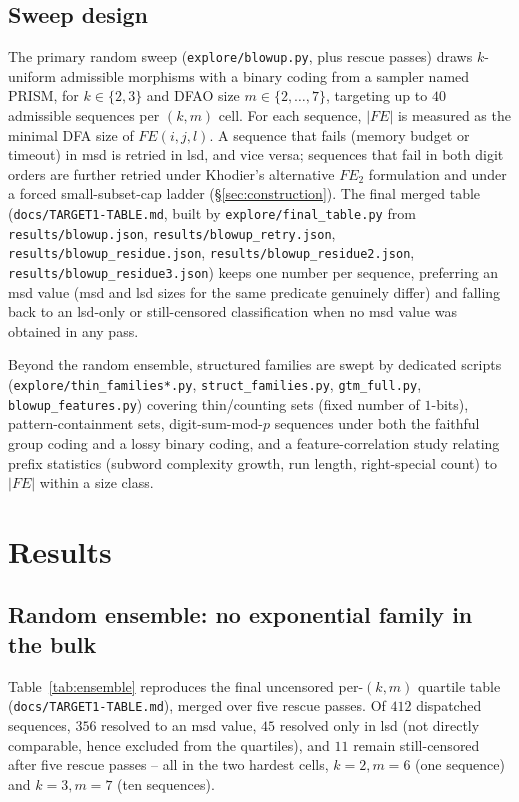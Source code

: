 \documentclass[11pt]{article}
\begin{document}
\subsection{Sweep design}
The primary random sweep (\texttt{explore/blowup.py}, plus rescue passes) draws
$k$-uniform admissible morphisms with a binary coding from a sampler named PRISM, for
$k\in\{2,3\}$ and DFAO size $m\in\{2,\ldots,7\}$, targeting up to $40$ admissible
sequences per $(k,m)$ cell. For each sequence, $|FE|$ is measured as the minimal DFA size
of $FE(i,j,l)$. A sequence that fails (memory budget or timeout) in msd is retried in
lsd, and vice versa; sequences that fail in both digit orders are further retried under
Khodier's alternative $FE_2$ formulation and under a forced small-subset-cap ladder
(\S\ref{sec:construction}). The final merged table (\texttt{docs/TARGET1-TABLE.md},
built by \texttt{explore/final\_table.py} from \texttt{results/blowup.json},
\texttt{results/blowup\_retry.json}, \texttt{results/blowup\_residue.json},
\texttt{results/blowup\_residue2.json}, \texttt{results/blowup\_residue3.json}) keeps one
number per sequence, preferring an msd value (msd and lsd sizes for the same predicate
genuinely differ) and falling back to an lsd-only or still-censored classification when
no msd value was obtained in any pass.

Beyond the random ensemble, structured families are swept by dedicated scripts
(\texttt{explore/thin\_families*.py}, \texttt{struct\_families.py}, \texttt{gtm\_full.py},
\texttt{blowup\_features.py}) covering thin/counting sets (fixed number of $1$-bits),
pattern-containment sets, digit-sum-mod-$p$ sequences under both the faithful group
coding and a lossy binary coding, and a feature-correlation study relating prefix
statistics (subword complexity growth, run length, right-special count) to $|FE|$ within
a size class.

\section{Results}
\label{sec:results}

\subsection{Random ensemble: no exponential family in the bulk}

Table~\ref{tab:ensemble} reproduces the final uncensored per-$(k,m)$ quartile table
(\texttt{docs/TARGET1-TABLE.md}), merged over five rescue passes. Of $412$ dispatched
sequences, $356$ resolved to an msd value, $45$ resolved only in lsd (not directly
comparable, hence excluded from the quartiles), and $11$ remain still-censored after five
rescue passes -- all in the two hardest cells, $k=2,m=6$ (one sequence) and $k=3,m=7$
(ten sequences).
\end{document}
